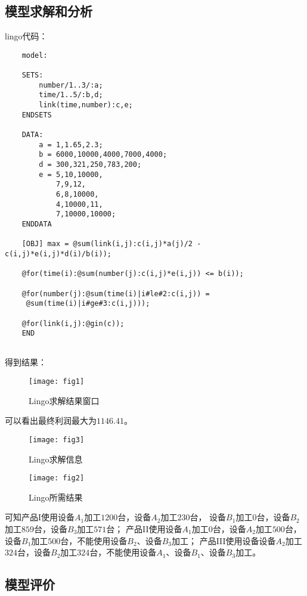 \documentclass[nocover]{cumcmart}%
\begin{document}
\subsection{模型求解和分析}
    lingo代码：
    \begin{verbatim}
    model:
    
    SETS:
        number/1..3/:a;
        time/1..5/:b,d;
        link(time,number):c,e;
    ENDSETS
    
    DATA:
        a = 1,1.65,2.3;
        b = 6000,10000,4000,7000,4000;
        d = 300,321,250,783,200;
        e = 5,10,10000,
            7,9,12,
            6,8,10000,
            4,10000,11,
            7,10000,10000;
    ENDDATA
    
    [OBJ] max = @sum(link(i,j):c(i,j)*a(j)/2 - c(i,j)*e(i,j)*d(i)/b(i));
    
    @for(time(i):@sum(number(j):c(i,j)*e(i,j)) <= b(i));
    
    @for(number(j):@sum(time(i)|i#le#2:c(i,j)) =
     @sum(time(i)|i#ge#3:c(i,j)));
    
    @for(link(i,j):@gin(c));
    END
    
    \end{verbatim}
    得到结果：
    
    \begin{figure}
    \centering
    \texttt{[image: fig1]}
    \caption{Lingo求解结果窗口}
    \end{figure}
    
    可以看出最终利润最大为${1146.41}$。
    \begin{figure}
    \centering
    \texttt{[image: fig3]}
    \caption{Lingo求解信息}
    \end{figure}

    \begin{figure}
    \centering
    \texttt{[image: fig2]}
    \caption{Lingo所需结果}
    \end{figure}
    可知产品I使用设备${A_1}$加工${1200}$台，设备${A_2}$加工${230}$台，
    设备${B_1}$加工${0}$台，设备${B_2}$加工${859}$台，设备${B_3}$加工${571}$台；
    产品II使用设备${A_1}$加工${0}$台，设备${A_2}$加工${500}$台，
    设备${B_1}$加工${500}$台，不能使用设备${B_2}$、设备${B_3}$加工；
    产品III使用设备设备${A_2}$加工${324}$台，设备${B_2}$加工${324}$台，不能使用设备${A_1}$、设备${B_1}$、设备${B_3}$加工。

\subsection{模型评价}
\end{document}
